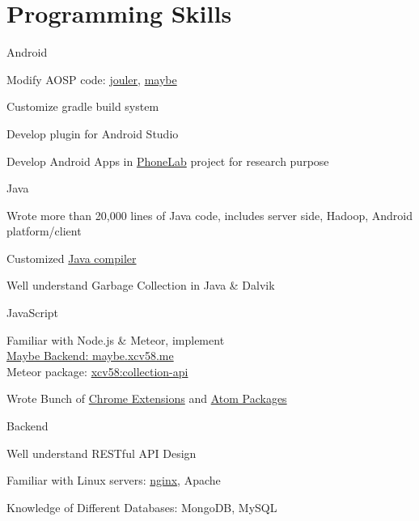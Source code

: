 

\section{Programming Skills}
\cvcomputer
{Android}{
\begin{tightitemize}
  \item Modify AOSP code:
  \href{http://platform.phone-lab.org:8080/gitweb?p=platform/frameworks/base.git;a=search;h=refs/heads/experiment/1/jouler;s=Yihong+Chen;st=author}{jouler},
  \href{http://platform.phone-lab.org:8080/gitweb?p=platform/frameworks/base.git;a=search;h=refs/heads/experiment/3/maybe;s=Yihong+Chen;st=author}{maybe}
  \item Customize gradle build system
  \item Develop plugin for Android Studio
  \item Develop Android Apps in
  \href{https://phone-lab.org/}{PhoneLab} project for research purpose
\end{tightitemize}
}
{Java}{
\begin{tightitemize}
  \item Wrote more than 20,000 lines of Java code, includes server side, Hadoop, Android platform/client
  \item Customized \href{https://github.com/blue-systems-group/project.maybe.polyglot}{Java compiler}
  \item Well understand Garbage Collection in Java \& Dalvik
\end{tightitemize}
}

\cvcomputer
{JavaScript}{
\begin{tightitemize}
  \item Familiar with Node.js \& Meteor, implement
  \\\href{http://maybe.cse.buffalo.edu}{Maybe Backend: maybe.xcv58.me}
  \\Meteor package:
  \href{https://atmospherejs.com/xcv58/collection-api}{xcv58:collection-api}
  \item Wrote Bunch of \href{https://chrome.google.com/webstore/search/xcv58?hl=en}{Chrome Extensions} and
  \href{https://atom.io/users/xcv58}{Atom Packages}
\end{tightitemize}
}
{Backend}{
\begin{tightitemize}
  \item Well understand RESTful API Design
  \item Familiar with Linux servers:
  \href{https://github.com/xcv58/nginx-config}{nginx}, Apache
  \item Knowledge of Different Databases: MongoDB, MySQL
\end{tightitemize}
}

